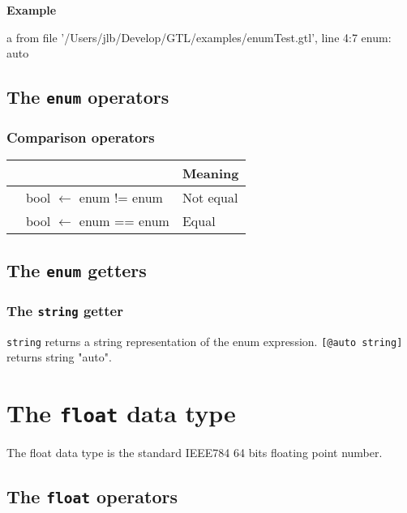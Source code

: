 \documentclass[10pt,openright,twosides]{report}
\newcommand{\gtltype}[1]{{\small\ttfamily #1}}
\newcommand{\scst}[1]{{\footnotesize\ttfamily\colorbox{light-blue}{"#1"}}}
\newcommand{\gtlinline}[1]{\colorbox{light-blue}{\lstinline[language=gtl]{#1}}}
\newcommand{\example}{\vspace{.75em}\noindent\textbf{Example}\vspace{0em}}
\begin{document}
\example
{}
\begin{console}
a from file '/Users/jlb/Develop/GTL/examples/enumTest.gtl', line 4:7
    enum: auto
\end{console}

\subsection{The \texttt{enum} operators}

\subsubsection{Comparison operators}

\begin{longtable}{>{\ttfamily}l|>{\ttfamily}l|l}
{\bf Operator}&{\bf Expression type}&{\bf Meaning}\\
\hline\endhead
 {!=}&
  {bool $\leftarrow$ enum != enum}&
  {Not equal}\\
 {==}&
  {bool $\leftarrow$ enum == enum}&
  {Equal}\\
\end{longtable}

\subsection{The \texttt{enum} getters}

\subsubsection{The \texttt{string} getter}

\gtlinline{string} returns a string representation of the enum expression. \gtlinline{[@auto string]} returns string \scst{auto}.

\section{The \texttt{float} data type}

The \gtltype{float} data type is the standard IEEE784 64 bits floating point number.

\subsection{The \texttt{float} operators}
\end{document}
